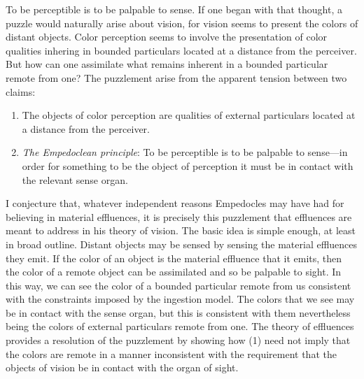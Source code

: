 To be perceptible is to be palpable to sense. If one began with that thought, a puzzle would naturally arise about vision, for vision seems to present the colors of distant objects. Color perception seems to involve the presentation of color qualities inhering in bounded particulars located at a distance from the perceiver. But how can one assimilate what remains inherent in a bounded particular remote from one? The puzzlement arise from the apparent tension between two claims:
\begin{enumerate}[(1)]
    \item The objects of color perception are qualities of external particulars located at a distance from the perceiver.
    \item \emph{The Empedoclean principle}: To be perceptible is to be palpable to sense---in order for something to be the object of perception it must be in contact with the relevant sense organ.
\end{enumerate}
I conjecture that, whatever independent reasons Empedocles may have had for believing in material effluences, it is precisely this puzzlement that effluences are meant to address in his theory of vision. The basic idea is simple enough, at least in broad outline. Distant objects may be sensed by sensing the material effluences they emit. If the color of an object is the material effluence that it emits, then the color of a remote object can be assimilated and so be palpable to sight. In this way, we can see the color of a bounded particular remote from us  consistent with the constraints imposed by the ingestion model. The colors that we see may be in contact with the sense organ, but this is consistent with them nevertheless being the colors of external particulars remote from one. The theory of effluences provides a resolution of the puzzlement by showing how (1) need not imply that the colors are remote in a manner inconsistent with the requirement that the objects of vision be in contact with the organ of sight.

